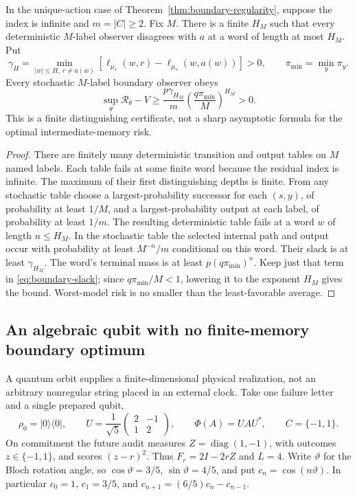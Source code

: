 \begin{proposition}\label{prop:boundary-depth-gap}
In the unique-action case of Theorem~\ref{thm:boundary-regularity}, suppose the index is infinite and $m=|C|\ge2$. Fix $M$. There is a finite $H_M$ such that every deterministic $M$-label observer disagrees with $a$ at a word of length at most $H_M$. Put
\[
 \gamma_H=\min_{|w|\le H,\ r\ne a(w)}
       [\ell_{\mu_*}(w,r)-\ell_{\mu_*}(w,a(w))]>0,
 \qquad \pi_{\min}=\min_y\pi_y.
\]
Every stochastic $M$-label boundary observer obeys
\begin{equation}\label{eq:boundary-quantitative-gap}
 \sup_\theta\mathcal R_\theta-V
       \ge\frac{p\gamma_{H_M}}{m}
                    \left(\frac{q\pi_{\min}}{M}\right)^{H_M}>0.
\end{equation}
This is a finite distinguishing certificate, not a sharp asymptotic formula for the optimal intermediate-memory risk.
\end{proposition}
\begin{proof}
There are finitely many deterministic transition and output tables on $M$ named labels. Each table fails at some finite word because the residual index is infinite. The maximum of their first distinguishing depths is finite. From any stochastic table choose a largest-probability successor for each $(s,y)$, of probability at least $1/M$, and a largest-probability output at each label, of probability at least $1/m$. The resulting deterministic table fails at a word $w$ of length $n\le H_M$. In the stochastic table the selected internal path and output occur with probability at least $M^{-n}/m$ conditional on this word. Their slack is at least $\gamma_{H_M}$. The word's terminal mass is at least $p(q\pi_{\min})^n$. Keep just that term in \eqref{eq:boundary-slack}; since $q\pi_{\min}/M<1$, lowering it to the exponent $H_M$ gives the bound. Worst-model risk is no smaller than the least-favorable average.
\end{proof}

\subsection{An algebraic qubit with no finite-memory boundary optimum}
A quantum orbit supplies a finite-dimensional physical realization, not an arbitrary nonregular string placed in an external clock. Take one failure letter and a single prepared qubit,
\begin{equation}\label{eq:qubit-boundary-data}
 \rho_0=|0\rangle\langle0|,\qquad
 U=\frac1{\sqrt5}\begin{pmatrix}2&-1\\1&2\end{pmatrix},\qquad
 \Phi(A)=UAU^*,\qquad C=\{-1,1\}.
\end{equation}
On commitment the future audit measures $Z=\operatorname{diag}(1,-1)$, with outcomes $z\in\{-1,1\}$, and scores $(z-r)^2$. Thus $F_r=2I-2rZ$ and $L=4$. Write $\vartheta$ for the Bloch rotation angle, so $\cos\vartheta=3/5$, $\sin\vartheta=4/5$, and put $c_n=\cos(n\vartheta)$. In particular $c_0=1$, $c_1=3/5$, and $c_{n+1}=(6/5)c_n-c_{n-1}$.

